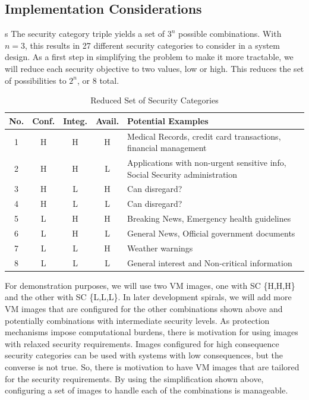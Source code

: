 \documentclass{sig-alternate}
\begin{document}
\subsection{Implementation Considerations}s
The security category triple yields a set of $3^{n}$ possible combinations.  With $n = 3$, this results in 27 different security categories to consider in a system design.  As a first step in simplifying the problem to make it more tractable, we will reduce each security objective to two values, low or high.  This reduces the set of possibilities to $2^{n}$, or 8 total.

\begin{table}
\begin{tabular}{|c|c|c|c|p{1.3in}|}
\hline
No. & Conf. & Integ. & Avail. & Potential Examples \\
\hline
1 & H & H & H & Medical Records, 
credit card transactions,
financial management \\
\hline
2 & H & H & L & Applications with non-urgent sensitive info, 
Social Security administration \\
\hline
3 & H & L & H & Can disregard? \\
\hline
4 & H & L & L & Can disregard? \\
\hline
5 & L & H & H & Breaking News, 
                Emergency health guidelines \\
\hline
6 & L & H & L & General News,
                Official government documents \\
\hline
7 & L & L & H & Weather warnings \\
\hline
8 & L & L & L & General interest and
                Non-critical information \\
\hline
\end{tabular} 
\caption{Reduced Set of Security Categories}
\end{table}

For demonstration purposes, we will use two VM images, one with SC \{H,H,H\} and the other with SC \{L,L,L\}.  In later development spirals, we will add more VM images that are configured  for the other combinations shown above and potentially combinations with intermediate security levels.  As protection mechanisms impose computational burdens, there is motivation for using images with relaxed security requirements. Images configured for high consequence security categories can be used with systems with low consequences, but the converse is not true.  So, there is motivation to have VM images that are tailored for the security requirements.  By using the simplification shown above, configuring a set of images to handle each of the combinations is manageable. 
\end{document}
